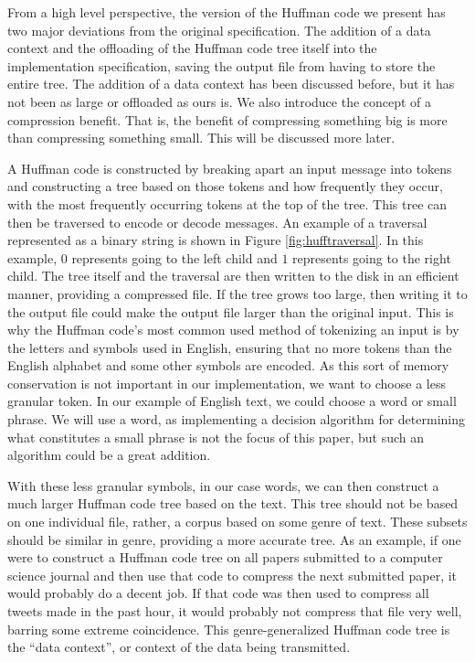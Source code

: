 From a high level perspective, the version of the Huffman code we present has two major deviations from the original specification. The addition of a data context and the offloading of the Huffman code tree itself into the implementation specification, saving the output file from having to store the entire tree. The addition of a data context has been discussed before, but it has not been as large or offloaded as ours is.\cite{huffimage} We also introduce the concept of a compression benefit. That is, the benefit of compressing something big is more than compressing something small. This will be discussed more later.

A Huffman code is constructed by breaking apart an input message into tokens and constructing a tree based on those tokens and how frequently they occur, with the most frequently occurring tokens at the top of the tree. This tree can then be traversed to encode or decode messages. An example of a traversal represented as a binary string is shown in Figure \ref{fig:hufftraversal}. In this example, $0$ represents going to the left child and $1$ represents going to the right child. The tree itself and the traversal are then written to the disk in an efficient manner, providing a compressed file. If the tree grows too large, then writing it to the output file could make the output file larger than the original input. This is why the Huffman code's most common used method of tokenizing an input is by the letters and symbols used in English, ensuring that no more tokens than the English alphabet and some other symbols are encoded. As this sort of memory conservation is not important in our implementation, we want to choose a less granular token. In our example of English text, we could choose a word or small phrase. We will use a word, as implementing a decision algorithm for determining what constitutes a small phrase is not the focus of this paper, but such an algorithm could be a great addition.

With these less granular symbols, in our case words, we can then construct a much larger Huffman code tree based on the text. This tree should not be based on one individual file, rather, a corpus based on some genre of text. These subsets should be similar in genre, providing a more accurate tree. As an example, if one were to construct a Huffman code tree on all papers submitted to a computer science journal and then use that code to compress the next submitted paper, it would probably do a decent job. If that code was then used to compress all tweets made in the past hour, it would probably not compress that file very well, barring some extreme coincidence. This genre-generalized Huffman code tree is the ``data context'', or context of the data being transmitted.

